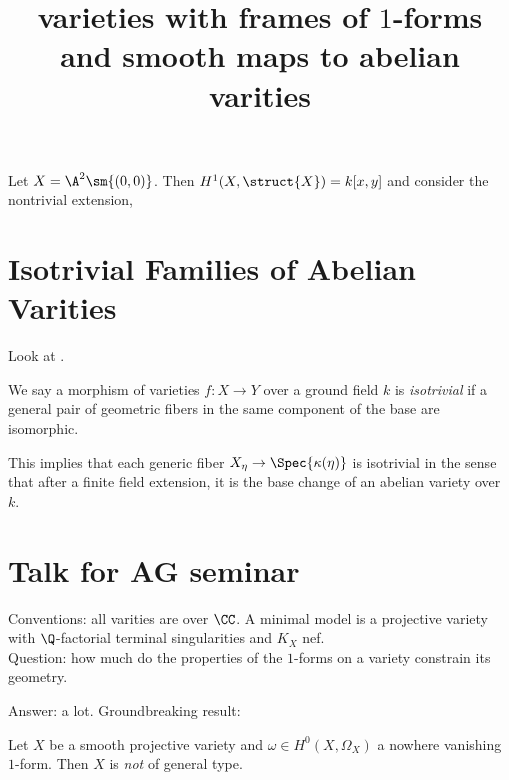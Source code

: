 \documentclass[12pt]{article}
\begin{document}
\begin{example}
Let $X = \A^2 \sm \{ (0,0) \}$. Then $H^1(X, \struct{X}) = k[x,y]$ and consider the nontrivial extension,
\begin{center}
\begin{tikzcd}

\end{tikzcd}
\end{center}
\end{example}

\section{Isotrivial Families of Abelian Varities}

Look at .

\begin{definition}
We say a morphism of varieties $f : X \to Y$ over a ground field $k$ is \textit{isotrivial} if a general pair of geometric fibers in the same component of the base are isomorphic.
\end{definition}

\begin{remark}
This implies that each generic fiber $X_{\eta} \to \Spec{\kappa(\eta)}$ is isotrivial in the sense that after a finite field extension, it is the base change of an abelian variety over $k$.
\end{remark}

\section{Talk for AG seminar}

\title{varieties with frames of $1$-forms and smooth maps to abelian varities}

Conventions: all varities are over $\CC$. A minimal model is a projective variety with $\Q$-factorial terminal singularities and $K_X$ nef. 
\\ 

Question: how much do the properties of the $1$-forms on a variety constrain its geometry.

Answer: a lot. Groundbreaking result:

\begin{theorem}
Let $X$ be a smooth projective variety and $\omega \in H^0(X, \Omega_X)$ a nowhere vanishing $1$-form. Then $X$ is \textit{not} of general type. 
\end{theorem}
\end{document}

